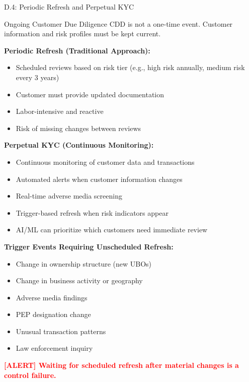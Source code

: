 \documentclass[11pt,a4paper]{beamer}
\newcommand{\redflag}[1]{\textcolor{red}{\textbf{[ALERT] #1}}}
\begin{document}
\begin{frame}{D.4: Periodic Refresh and Perpetual KYC}
	\begin{block}{Ongoing Customer Due Diligence}
		CDD is not a one-time event. Customer information and risk profiles must be kept current.
	\end{block}
	\textbf{Periodic Refresh (Traditional Approach):}
	\begin{itemize}
		\item Scheduled reviews based on risk tier (e.g., high risk annually, medium risk every 3 years)
		\item Customer must provide updated documentation
		\item Labor-intensive and reactive
		\item Risk of missing changes between reviews
	\end{itemize}
	\textbf{Perpetual KYC (Continuous Monitoring):}
	\begin{itemize}
		\item Continuous monitoring of customer data and transactions
		\item Automated alerts when customer information changes
		\item Real-time adverse media screening
		\item Trigger-based refresh when risk indicators appear
		\item AI/ML can prioritize which customers need immediate review
	\end{itemize}
	\textbf{Trigger Events Requiring Unscheduled Refresh:}
	\begin{itemize}
		\item Change in ownership structure (new UBOs)
		\item Change in business activity or geography
		\item Adverse media findings
		\item PEP designation change
		\item Unusual transaction patterns
		\item Law enforcement inquiry
	\end{itemize}
	\redflag{Waiting for scheduled refresh after material changes is a control failure.}
\end{frame}
\end{document}
